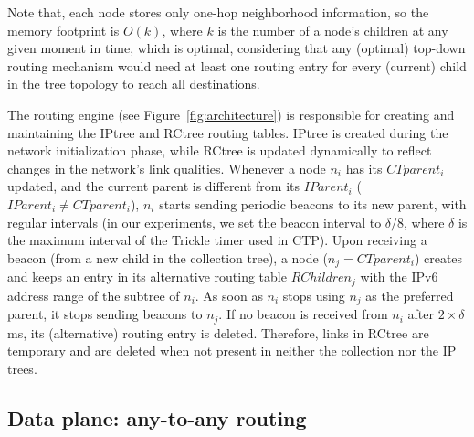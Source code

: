 Note that, each node stores only one-hop
neighborhood information, so the memory footprint is $O(k)$, where $k$ is the
number of a node's children at any given moment in time, which is optimal,
considering that any (optimal) top-down routing mechanism would need at
least one routing entry for every (current) child in the tree topology to reach
all destinations.

The routing engine (see Figure~\ref{fig:architecture}) is responsible for
creating and maintaining the IPtree and RCtree routing tables. IPtree is created
during the network initialization phase, while RCtree is updated dynamically to
reflect changes in the network's link qualities. Whenever a node $n_i$ has its
$CTparent_i$ updated, and the current parent is different from its
$IParent_i$ ($IParent_i \neq CTparent_i$), $n_i$ starts sending periodic beacons
to its new parent, with regular intervals (in our experiments, we set the beacon
interval to $\delta/8$, where $\delta$ is the maximum interval of the
Trickle timer used in CTP).
Upon receiving a beacon (from a new child in the collection tree), a node
($n_j = CTparent_i$) creates and keeps an entry in its alternative
routing table $RChildren_j$ with the IPv6 address range of the subtree of $n_i$. As soon as $n_i$
stops using $n_j$ as the preferred parent, it stops sending beacons to $n_j$.
If no beacon is received from $n_i$ after $2\times\delta$ ms, its (alternative)
routing entry is deleted. Therefore, links in RCtree are temporary and are deleted when not present in neither the
collection nor the IP trees.

\subsection{Data plane: any-to-any routing}



